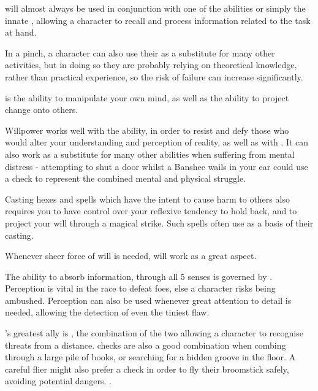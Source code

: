  will almost always be used in conjunction with one of the  abilities or simply the innate , allowing a character to recall and process information related to the task at hand. 

In a pinch, a character can also use their  as a substitute for many other activities, but in doing so they are probably relying on theoretical knowledge, rather than practical experience, so the risk of failure can increase significantly. 



 is the ability to manipulate your own mind, as well as the ability to project change onto others. 

Willpower works well with the  ability, in order to resist and defy those who would alter your understanding and perception of reality, as well as with . It can also work as a substitute for many other abilities when suffering from mental distress - attempting to shut a door whilst a Banshee wails in your ear could use a  check to represent the combined mental and physical struggle. 

Casting hexes and spells which have the intent to cause harm to others also requires you to have control over your reflexive tendency to hold back, and to project your will through a magical strike. Such spells often use  as a basis of their casting.  

Whenever sheer force of will is needed,  will work as a great aspect. 




The ability to absorb information, through all 5 senses is governed by . Perception is vital in the race to defeat foes, else a character risks being ambushed. Perception can also be used whenever great attention to detail is needed, allowing the detection of even the tiniest flaw.  

's greatest ally is , the combination of the two allowing a character to recognise threats from a distance.  checks are also a good combination when combing through a large pile of books, or searching for a hidden groove in the floor. A careful flier might also prefer a  check in order to fly their broomstick safely, avoiding potential dangers. . 

